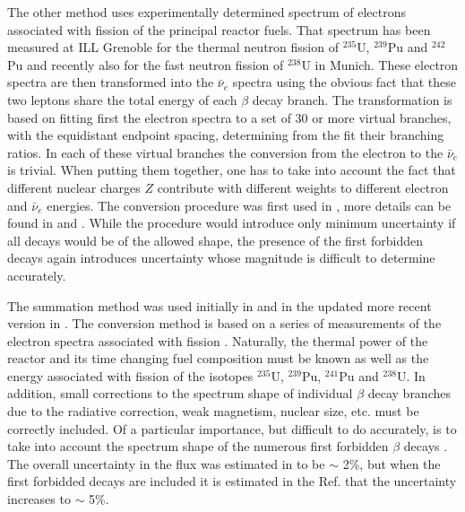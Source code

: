  The other method uses experimentally determined spectrum of electrons associated with fission of the principal reactor fuels. That spectrum has been 
 measured at ILL Grenoble for the thermal neutron fission of $^{235}$U, $^{239}$Pu and $^{242}$Pu and recently also for the fast neutron fission of $^{238}$U
 in Munich. These electron spectra are then transformed into the $\bar{\nu}_e$ spectra using the obvious fact that these two leptons share the total energy
 of each $\beta$ decay branch. The transformation is based on fitting first the electron spectra to a set of 30 or more virtual branches, with the equidistant
 endpoint spacing, determining from the fit their branching ratios. In each of these virtual branches the conversion from the electron to the $\bar{\nu}_e$ is 
 trivial. When putting them together, one has to take into account the fact that different nuclear charges $Z$ contribute with different weights to different electron
 and $\bar{\nu}_e$ energies. The conversion procedure was first used in \cite{vonFeilitzsch,Schreckenbach,Hahn}, more details can be found in
 \cite{Vogel07} and \cite{Huber}.
 While the procedure would introduce only minimum uncertainty if all decays would be of the allowed shape, the presence
 of the first forbidden decays again introduces uncertainty whose magnitude is difficult to determine accurately.


The summation method was used
initially in \cite{Davis,Vogel81,Klapdor-Pu,Klapdor-U,Kopeikin} and in the updated more recent version in \cite{Mueller, Huber}. The conversion method is based on a series
of measurements of the electron spectra associated with fission \cite{vonFeilitzsch,Schreckenbach,Hahn,Haag}. Naturally, the thermal power of the reactor
and its time changing fuel composition must be known as well as the energy associated with fission of the isotopes $^{235}$U, $^{239}$Pu, $^{241}$Pu
and $^{238}$U. In addition, small corrections to the spectrum shape of individual $\beta$ decay branches due to the radiative correction, weak magnetism,
nuclear size,
etc. must be correctly included. Of a particular importance, but difficult to do accurately, is to take into account the spectrum shape of the numerous
first forbidden $\beta$ decays \cite{Hayes}. The overall uncertainty in the flux was estimated in \cite{Mueller, Huber} to be $\sim$ 2\%, but when the
first forbidded decays are included it is estimated in the Ref. \cite{Hayes} that the uncertainty increases to $\sim$ 5\%.

